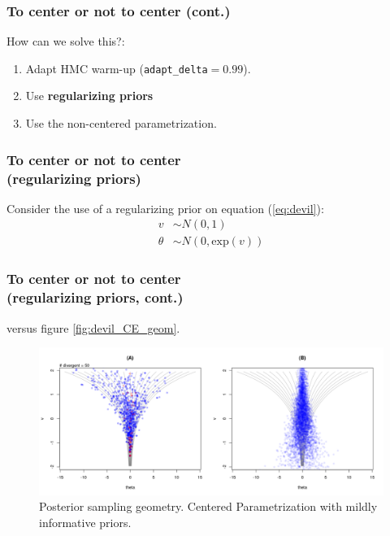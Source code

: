 \documentclass[nonav,sleutel]{beamer}
\begin{document}
	\begin{frame}
		\frametitle{To center or not to center (cont.)}
		How can we solve this?:
		\begin{enumerate}
			\item Adapt HMC warm-up (\texttt{adapt\_delta}$=0.99$).
			\item Use \textbf{regularizing priors}
			\item Use the non-centered parametrization.
		\end{enumerate}
	\end{frame}
	\begin{frame}
		\frametitle{To center or not to center \\
			(regularizing priors)}
		Consider the use of a regularizing prior on equation (\ref{eq:devil}): 
		\begin{equation} \label{eq:devil_prior}
			\begin{split}	
				v &\sim N(0, 1) \\
				\theta &\sim N(0, \text{exp}(v))
			\end{split}
		\end{equation}
	\end{frame}
	\begin{frame}
		\frametitle{To center or not to center \\
			(regularizing priors, cont.)}
		versus figure \ref{fig:devil_CE_geom}.
		\begin{figure}[!h]
			\centering
			\includegraphics[width=1\linewidth]{2_funnel_CE_priors}
			\caption{Posterior sampling geometry. Centered Parametrization with mildly informative priors.}
			\label{fig:devil_prior_geom}
		\end{figure}
	\end{frame}
\end{document}
